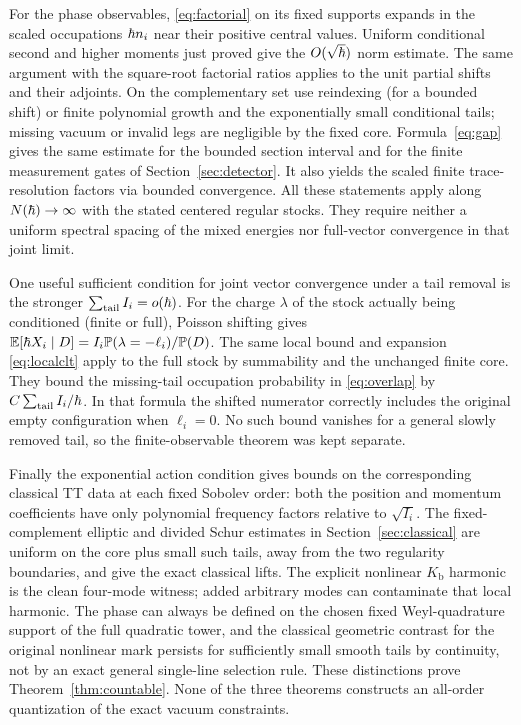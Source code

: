 For the phase observables, \eqref{eq:factorial} on its fixed supports expands in the scaled occupations \(\hbar n_i\) near their positive central values. Uniform conditional second and higher moments just proved give the \(O(\sqrt{\hbar})\) norm estimate. The same argument with the square-root factorial ratios applies to the unit partial shifts and their adjoints. On the complementary set use reindexing (for a bounded shift) or finite polynomial growth and the exponentially small conditional tails; missing vacuum or invalid legs are negligible by the fixed core. Formula~\eqref{eq:gap} gives the same estimate for the bounded section interval and for the finite measurement gates of Section~\ref{sec:detector}. It also yields the scaled finite trace-resolution factors via bounded convergence. All these statements apply along \(N(\hbar)\to\infty\) with the stated centered regular stocks. They require neither a uniform spectral spacing of the mixed energies nor full-vector convergence in that joint limit.

One useful sufficient condition for joint vector convergence under a tail removal is the stronger \(\sum_{\rm tail}I_i=o(\hbar)\). For the charge \(\lambda\) of the stock actually being conditioned (finite or full), Poisson shifting gives \(\mathbb E[\hbar X_i\mid D]=I_i\mathbb P(\lambda=-\ell_i)/\mathbb P(D)\). The same local bound and expansion \eqref{eq:localclt} apply to the full stock by summability and the unchanged finite core. They bound the missing-tail occupation probability in \eqref{eq:overlap} by \(C\sum_{\rm tail} I_i/\hbar\). In that formula the shifted numerator correctly includes the original empty configuration when \(\ell_i=0\). No such bound vanishes for a general slowly removed tail, so the finite-observable theorem was kept separate.

Finally the exponential action condition gives bounds on the corresponding classical TT data at each fixed Sobolev order: both the position and momentum coefficients have only polynomial frequency factors relative to \(\sqrt{I_i}\). The fixed-complement elliptic and divided Schur estimates in Section~\ref{sec:classical} are uniform on the core plus small such tails, away from the two regularity boundaries, and give the exact classical lifts. The explicit nonlinear \(K_{\mathrm b}\) harmonic is the clean four-mode witness; added arbitrary modes can contaminate that local harmonic. The phase can always be defined on the chosen fixed Weyl-quadrature support of the full quadratic tower, and the classical geometric contrast for the original nonlinear mark persists for sufficiently small smooth tails by continuity, not by an exact general single-line selection rule. These distinctions prove Theorem~\ref{thm:countable}. None of the three theorems constructs an all-order quantization of the exact vacuum constraints.


